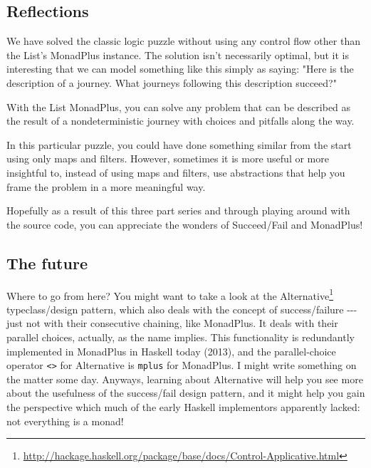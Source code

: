 \documentclass[]{article}
\renewcommand{\href}[2]{#2\footnote{\url{#1}}}
\begin{document}
\subsection{Reflections}

We have solved the classic logic puzzle without using any control flow other
than the List's MonadPlus instance. The solution isn't necessarily optimal, but
it is interesting that we can model something like this simply as saying: "Here
is the description of a journey. What journeys following this description
succeed?"

With the List MonadPlus, you can solve any problem that can be described as the
result of a nondeterministic journey with choices and pitfalls along the way.

In this particular puzzle, you could have done something similar from the start
using only maps and filters. However, sometimes it is more useful or more
insightful to, instead of using maps and filters, use abstractions that help you
frame the problem in a more meaningful way.

Hopefully as a result of this three part series and through playing around with
the source code, you can appreciate the wonders of Succeed/Fail and MonadPlus!

\subsection{The future}

Where to go from here? You might want to take a look at the
\href{http://hackage.haskell.org/package/base/docs/Control-Applicative.html}{Alternative}
typeclass/design pattern, which also deals with the concept of success/failure
-\/-\/- just not with their consecutive chaining, like MonadPlus. It deals with
their parallel choices, actually, as the name implies. This functionality is
redundantly implemented in MonadPlus in Haskell today (2013), and the
parallel-choice operator \texttt{\textless{}\textbar{}\textgreater{}} for
Alternative is \texttt{mplus} for MonadPlus. I might write something on the
matter some day. Anyways, learning about Alternative will help you see more
about the usefulness of the success/fail design pattern, and it might help you
gain the perspective which much of the early Haskell implementors apparently
lacked: not everything is a monad!
\end{document}
